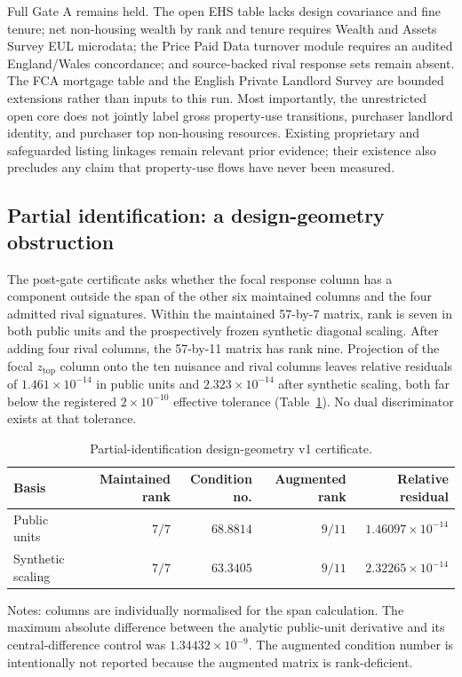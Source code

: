 Full Gate A remains held.  The open EHS table lacks design covariance and fine
tenure; net non-housing wealth by rank and tenure requires Wealth and Assets
Survey EUL microdata; the Price Paid Data turnover module requires an audited
England/Wales concordance; and source-backed rival response sets remain absent.
The FCA mortgage table and the English Private Landlord Survey are bounded
extensions rather than inputs to this run.  Most importantly, the unrestricted
open core does not jointly label gross property-use transitions, purchaser
landlord identity, and purchaser top non-housing resources.  Existing
proprietary and safeguarded listing linkages remain relevant prior evidence;
their existence also precludes any claim that property-use flows have never
been measured.

\subsection{Partial identification: a design-geometry obstruction}
\label{sec:partialid-results}

The post-gate certificate asks whether the focal response column has a
component outside the span of the other six maintained columns and the four
admitted rival signatures.  Within the maintained 57-by-7 matrix, rank is
seven in both public units and the prospectively frozen synthetic diagonal scaling.
After adding four rival columns, the 57-by-11 matrix has rank nine.  Projection
of the focal $z_{\mathrm{top}}$ column onto the ten nuisance and rival columns
leaves relative residuals of $1.461\times10^{-14}$ in public units and
$2.323\times10^{-14}$ after synthetic scaling, both far below the registered
$2\times10^{-10}$ effective tolerance (Table~\ref{tab:geometry-certificate}).
No dual discriminator exists at that tolerance.

\begin{table}[t]
  \centering
  \caption{Partial-identification design-geometry v1 certificate.}
  \label{tab:geometry-certificate}
  \small
  \begin{tabular}{@{}lrrrr@{}}
    \toprule
    Basis & Maintained rank & Condition no. & Augmented rank & Relative residual \\
    \midrule
    Public units & $7/7$ & $68.8814$ & $9/11$ & $1.46097\times10^{-14}$ \\
    Synthetic scaling & $7/7$ & $63.3405$ & $9/11$ & $2.32265\times10^{-14}$ \\
    \bottomrule
  \end{tabular}
  \parbox{0.94\columnwidth}{\footnotesize
    Notes: columns are individually normalised for the span calculation.  The
    maximum absolute difference between the analytic public-unit derivative
    and its central-difference control was $1.34432\times10^{-9}$.  The
    augmented condition number is intentionally not reported because the
    augmented matrix is rank-deficient.}
\end{table}

